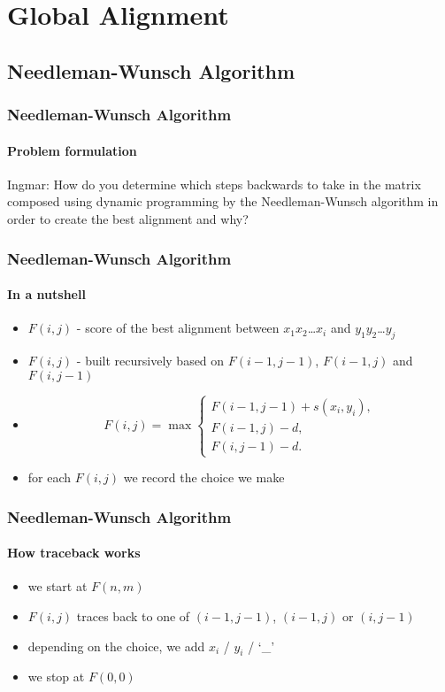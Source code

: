\documentclass{beamer}
\begin{document}
\section{Global Alignment}

\subsection{Needleman-Wunsch Algorithm}

\begin{frame}
  \frametitle{Needleman-Wunsch Algorithm}
  \framesubtitle{Problem formulation}

  \begin{block}{Ingmar:}
    How do you determine which steps backwards to take in the
    matrix composed using dynamic programming by the Needleman-Wunsch
    algorithm in order to create the best alignment and why?
  \end{block}
\end{frame}

\begin{frame}
  \frametitle{Needleman-Wunsch Algorithm}
  \framesubtitle{In a nutshell}

  \begin{itemize}
    \item $F(i,j)$ - score of the best alignment between $x_1$$x_2$\ldots$x_i$
          and $y_1$$y_2$\ldots$y_j$
    \item $F(i,j)$ - built recursively based on $F(i-1,j-1)$, $F(i-1,j)$
          and $F(i,j-1)$
    \item \begin{displaymath}
            F(i,j)=\max \begin{cases}
                          F(i-1,j-1)+s(x_i,y_i),\\
			  F(i-1,j)-d,\\
			  F(i,j-1)-d.
	                \end{cases}
          \end{displaymath}
    \item for each $F(i,j)$ \alert{we record the choice we make}
  \end{itemize}
\end{frame}

\begin{frame}
  \frametitle{Needleman-Wunsch Algorithm}
  \framesubtitle{How traceback works}

  \begin{itemize}
    \item we start at $F(n,m)$
    \item $F(i,j)$ \alert{traces back} to one of $(i-1,j-1)$, $(i-1,j)$ or $(i,j-1)$
    \item depending on the choice, we add $x_i$ / $y_i$ / `\_'
    \item we stop at $F(0,0)$
  \end{itemize}
\end{frame}
\end{document}
